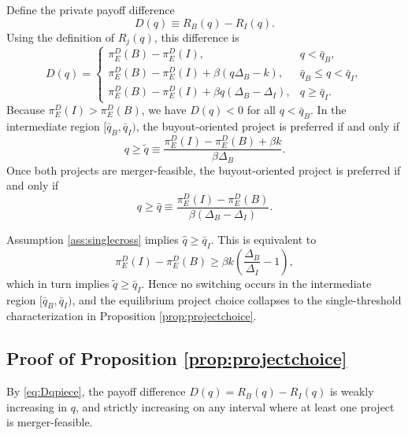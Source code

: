 Define the private payoff difference
\begin{equation}
    D(q)\equiv R_B(q)-R_I(q).
\end{equation}
Using the definition of \(R_j(q)\), this difference is
\begin{equation}\label{eq:Dqpiece}
    D(q)
    =
    \begin{cases}
        \pi_E^D(B)-\pi_E^D(I), &
        q < \bar q_B, \\
        \pi_E^D(B)-\pi_E^D(I)+\beta(q\Delta_B-k), &
        \bar q_B \le q < \bar q_I, \\
        \pi_E^D(B)-\pi_E^D(I)+\beta q(\Delta_B-\Delta_I), &
        q \ge \bar q_I.
    \end{cases}
\end{equation}
Because \(\pi_E^D(I)>\pi_E^D(B)\), we have \(D(q)<0\) for all \(q<\bar q_B\).
In the intermediate region \([\bar q_B,\bar q_I)\), the buyout-oriented project is preferred if and only if
\begin{equation}\label{eq:qtilde}
    q \ge \tilde q
    \equiv
    \frac{\pi_E^D(I)-\pi_E^D(B)+\beta k}{\beta \Delta_B}.
\end{equation}
Once both projects are merger-feasible, the buyout-oriented project is preferred if and only if
\begin{equation}\label{eq:qhatappendix}
    q \ge \hat q
    \equiv
    \frac{\pi_E^D(I)-\pi_E^D(B)}{\beta(\Delta_B-\Delta_I)}.
\end{equation}

Assumption \ref{ass:singlecross} implies \(\hat q \ge \bar q_I\).
This is equivalent to
\begin{equation}
    \pi_E^D(I)-\pi_E^D(B)
    \ge
    \beta k\left(\frac{\Delta_B}{\Delta_I}-1\right),
\end{equation}
which in turn implies \(\tilde q \ge \bar q_I\).
Hence no switching occurs in the intermediate region \([\bar q_B,\bar q_I)\), and the equilibrium project choice collapses to the single-threshold characterization in Proposition \ref{prop:projectchoice}.

\subsection{Proof of Proposition \ref{prop:projectchoice}}

By \eqref{eq:Dqpiece}, the payoff difference \(D(q)=R_B(q)-R_I(q)\) is weakly increasing in \(q\), and strictly increasing on any interval where at least one project is merger-feasible.

